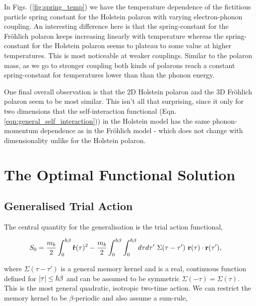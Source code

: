 In Figs. (\ref{fig:spring_temp}) we have the temperature dependence of the fictitious particle spring constant for the Holstein polaron with varying electron-phonon coupling. An interesting difference here is that the spring-constant for the Fr\"ohlich polaron keeps increasing linearly with temperature whereas the spring-constant for the Holstein polaron seems to plateau to some value at higher temperatures. This is most noticeable at weaker couplings. Similar to the polaron mass, as we go to stronger coupling both kinds of polarons reach a constant spring-constant for temperatures lower than than the phonon energy.
\newline

One final overall observation is that the 2D Holstein polaron and the 3D Fr\"ohlich polaron seem to be most similar. This isn't all that surprising, since it only for two dimensions that the self-interaction functional (Eqn. \ref{eqn:general_self_interaction})) in the Holstein model has the same phonon-momentum dependence as in the Fr\"ohlich model - which does not change with dimensionality unlike for the Holstein polaron.

\section{The Optimal Functional Solution}
\label{sec:chap-fourth-second}

\subsection{Generalised Trial Action}

The central quantity for the generalisation is the trial action functional,

\begin{equation} \label{eqn:generaltrial}
    \begin{aligned}
        S_0 &= \frac{m_b}{2} \int_0^{\hbar\beta} \vb{\Dot{r}}(\tau)^2 - \frac{m_b}{2} \int_0^{\hbar\beta} \int_0^{\hbar\beta} d\tau d\tau'\ \Sigma(\tau - \tau')\ \vb{r}(\tau) \cdot \vb{r}(\tau'),
    \end{aligned}
\end{equation}

where $\Sigma(\tau - \tau')$ is a general memory kernel and is a real, continuous function defined for $\abs{\tau} \leq \hbar\beta$ and can be assumed to be symmetric $\Sigma(-\tau) = \Sigma(\tau)$. This is the most general quadratic, isotropic two-time action. We can restrict the memory kernel to be $\beta$-periodic and also assume a sum-rule,

